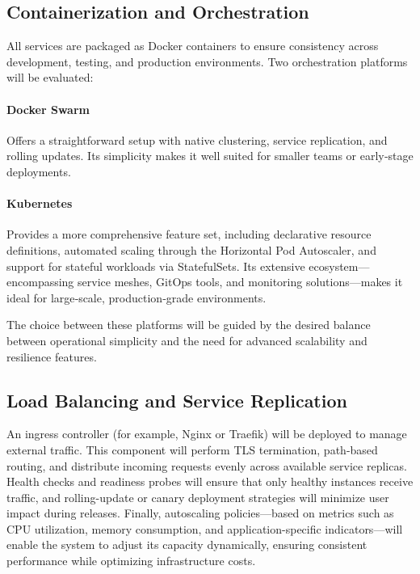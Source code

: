 \subsection{Containerization and Orchestration}

All services are packaged as Docker containers to ensure consistency across development, testing, and production environments. Two orchestration platforms will be evaluated:

\paragraph{Docker Swarm}  
Offers a straightforward setup with native clustering, service replication, and rolling updates. Its simplicity makes it well suited for smaller teams or early‐stage deployments.

\paragraph{Kubernetes}  
Provides a more comprehensive feature set, including declarative resource definitions, automated scaling through the Horizontal Pod Autoscaler, and support for stateful workloads via StatefulSets. Its extensive ecosystem—encompassing service meshes, GitOps tools, and monitoring solutions—makes it ideal for large‐scale, production‐grade environments.

The choice between these platforms will be guided by the desired balance between operational simplicity and the need for advanced scalability and resilience features.

\subsection{Load Balancing and Service Replication}

An ingress controller (for example, Nginx\cite{NGINX} or Traefik\cite{NGINX}) will be deployed to manage external traffic. This component will perform TLS termination, path-based routing, and distribute incoming requests evenly across available service replicas. Health checks and readiness probes will ensure that only healthy instances receive traffic, and rolling-update or canary deployment strategies will minimize user impact during releases. Finally, autoscaling policies—based on metrics such as CPU utilization, memory consumption, and application-specific indicators—will enable the system to adjust its capacity dynamically, ensuring consistent performance while optimizing infrastructure costs.  

